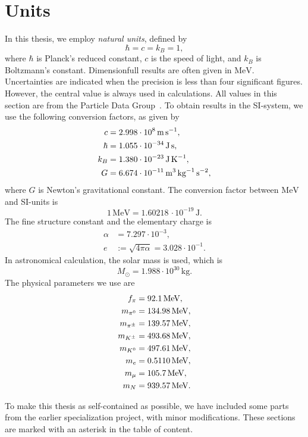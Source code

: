 \section{Units}
\label{section: units}


In this thesis, we employ \emph{natural units}, defined by
%
\begin{equation}
    \hbar = c = k_B = 1,
\end{equation}
%
where $\hbar$ is Planck's reduced constant, $c$ is the speed of light, and $k_B$ is Boltzmann's constant.
Dimensionfull results are often given in $\text{MeV}$.
Uncertainties are indicated when the precision is less than four significant figures. 
However, the central value is always used in calculations.
All values in this section are from the Particle Data Group~\cite{particledatagroupReviewParticlePhysics2020}.
To obtain results in the SI-system, we use the following conversion factors, as given by
%
\begin{align}
    \label{speed of ligh}
    c       &= 2.998 \cdot 10^8     \, \text{m} \, \text{s}^{-1}, \\
    \label{hbar}
    \hbar   &= 1.055 \cdot 10^{-34} \, \text{J} \, \text{s}, \\
    \label{Boltzmanns constat}
    k_B     &= 1.380 \cdot 10^{-23} \, \text{J} \, \text K^{-1}, \\
    \label{Newtons gravitational constant}
    G       &= 6.674 \cdot 10^{-11} \, \text m^3 \, \text{kg}^{-1} \, \text s^{-2},
\end{align}
%
where $G$ is Newton's gravitational constant.
The conversion factor between $\text{MeV}$ and SI-units is
%
\begin{equation}
    \label{electronvolt}
    1 \, \text{MeV} = 1.60218\, \cdot 10^{-19} \, \text{J}. 
\end{equation}
%
The fine structure constant and the elementary charge is
%
\begin{align}
    \label{Fine structure constant}
    \alpha &= 7.297 \cdot 10^{-3}, \\
    \label{Elementary charge}
    e &:= \sqrt{4 \pi \alpha} =  3.028\cdot 10^{-1}.
\end{align}
%
In astronomical calculation, the solar mass is used, which is
%
\begin{equation}
    \label{solar mass}
    M_\odot = 1.988 \cdot 10^{30} \, \text{kg}.
\end{equation}
%
The physical parameters we use are
%
\begingroup
\allowdisplaybreaks %
\begin{align}
    \label{pion decay constant}
    f_\pi & =  92.1 \, \text{MeV}, \\
    \label{pion mass}
    m_{\pi^0} & = 134.98 \, \text{MeV}, \\
    \label{charged pion mass}
    m_{{\pi^\pm}} &= 139.57 \, \text{MeV}, \\
    m_{{K^\pm}} & = 493.68\,\text{MeV}, \\
    m_{{K^0}} & = 497.61\,\text{MeV}, \\
    m_e &= 0.5110 \, \text{MeV}, \\
    m_\mu &= 105.7 \, \text{MeV}, \\
    \label{mass of neutron}
    m_N &= 939.57 \, \text{MeV}.
\end{align}
\endgroup

To make this thesis as self-contained as possible, we have included some parts from the earlier specialization project, with minor modifications.
These sections are marked with an asterisk in the table of content.
